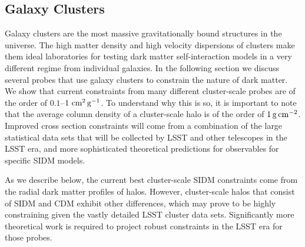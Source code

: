 \subsection{Galaxy Clusters }
\label{sec:halo_profile_clusters}

Galaxy clusters are the most massive gravitationally bound structures in the universe. The high matter density and high velocity dispersions of clusters make them ideal laboratories for testing dark matter self-interaction models in a very different regime from individual galaxies.
In the following section we discuss several probes that use galaxy clusters to constrain the nature of dark matter.  We show that current constraints from many different cluster-scale probes are of the order of $0.1$--$1\mathrm{\,\mathrm{\,cm}^2\mathrm{\,g}^{-1}}$.  To understand why this is so, it is important to note that the average column density of a cluster-scale halo is of the order of $1 \mathrm{\,g} \mathrm{\,cm}^{-2}$.  Improved cross section constraints will come from a combination of the large statistical data sets that will be collected by LSST and other telescopes in the LSST era, and more sophisticated theoretical predictions for observables for specific SIDM models.

\vspace{1em} 

As we describe below, the current best cluster-scale SIDM constraints come from the radial dark matter profiles of halos.  However, cluster-scale halos that consist of SIDM and CDM exhibit other differences, which may prove to be highly constraining given the vastly detailed LSST cluster data sets.  Significantly more theoretical work is required to project robust constraints in the LSST era for those probes.

